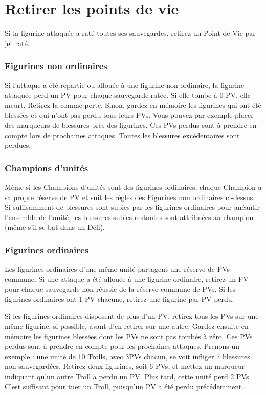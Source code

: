 \section{Retirer les points de vie}

Si la figurine attaquée a raté toutes ses sauvegardes, retirez un Point de Vie par jet raté. 

\subsubsection*{Figurines non ordinaires}

Si l'attaque a été répartie ou allouée à une figurine non ordinaire, la figurine attaquée perd un PV pour chaque sauvegarde ratée. Si elle tombe à 0 PV, elle meurt. Retirez-la comme perte. Sinon, gardez en mémoire les figurines qui ont été blessées et qui n'ont pas perdu tous leurs PVs. Vous pouvez par exemple placer des marqueurs de blessures près des figurines. Ces PVs perdus sont à prendre en compte lors de prochaines attaques. Toutes les blessures excédentaires sont perdues. 

\subsubsection*{Champions d'unités}
Même si les Champions d'unités sont des figurines ordinaires, chaque Champion a sa propre réserve de PV et suit les règles des Figurines non ordinaires ci-dessus. Si suffisamment de blessures sont subies par les figurines ordinaires pour anéantir l'ensemble de l'unité, les blessures subies restantes sont attribuées au champion (même s'il se bat dans un Défi).

\subsubsection*{Figurines ordinaires}

Les figurines ordinaires d'une même unité partagent une réserve de PVs commune. Si une attaque a été allouée à une figurine ordinaire, retirez un PV pour chaque sauvegarde non réussie de la réserve commune de PVs. Si les figurines ordinaires ont 1 PV chacune, retirez une figurine par PV perdu.

Si les figurines ordinaires disposent de plus d'un PV, retirez tous les PVs sur une même figurine, si possible, avant d'en retirer sur une autre. Gardez ensuite en mémoire les figurines blessées dont les PVs ne sont pas tombés à zéro. Ces PVs perdus sont à prendre en compte pour les prochaines attaques. Prenons un exemple : une unité de 10 Trolls, avec 3PVs chacun, se voit infliger 7 blessures non sauvegardées. Retirez deux figurines, soit 6 PVs, et mettez un marqueur indiquant qu'un autre Troll a perdu un PV. Plus tard, cette unité perd 2 PVs. C'est suffisant pour tuer un Troll, puisqu'un PV a été perdu précédemment. 

